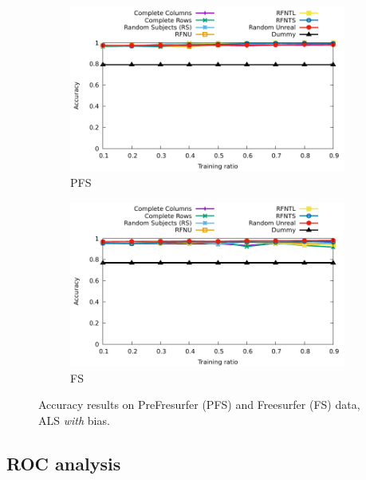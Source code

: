\documentclass[10pt, conference, compsocconf]{IEEEtran}
\begin{document}
\begin{figure}
\centering
\begin{subfigure}[b]{0.5\columnwidth}
        \includegraphics[width=\textwidth]{data/results/means_of_results/ALS-Bias/PreFreeSurfer/ALS-Bias-PFS-6v7.pdf}
        \caption{PFS}
\end{subfigure}\hfill
\begin{subfigure}[b]{0.5\columnwidth}
        \includegraphics[width=\textwidth]{data/results/means_of_results/ALS-Bias/FS-100files/ALS-Bias-FS100files.pdf}
        \caption{FS}
\end{subfigure}
\caption{Accuracy results on PreFresurfer (PFS) and Freesurfer (FS) data, ALS \emph{with} bias.}
\label{fig:results-real-als-bias}
\end{figure}

\subsection{ROC analysis}
\end{document}
